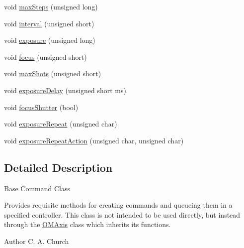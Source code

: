 \begin{DoxyCompactItemize}
\item 
void \hyperlink{class_o_m_command_acd5345ece18b375ba992af3b4317cb8d}{maxSteps} (unsigned long)
\item 
void \hyperlink{class_o_m_command_ac9b02c84746c59673538125ef61ae132}{interval} (unsigned short)
\item 
void \hyperlink{class_o_m_command_aab1d9a9eb29435af73c24f5799f4f8fe}{exposure} (unsigned long)
\item 
void \hyperlink{class_o_m_command_ae5a8b76a5666b1ff65216b48595932ec}{focus} (unsigned short)
\item 
void \hyperlink{class_o_m_command_aa826663213a989c75691a4c88cac4707}{maxShots} (unsigned short)
\item 
void \hyperlink{class_o_m_command_aba1bbf0fffb35a7806ed588b359e354e}{exposureDelay} (unsigned short ms)
\item 
void \hyperlink{class_o_m_command_ac674fe6db903fc35848bc10645ca36a3}{focusShutter} (bool)
\item 
void \hyperlink{class_o_m_command_ae11a454df4e3a0c756a9f9fbcd09af93}{exposureRepeat} (unsigned char)
\item 
void \hyperlink{class_o_m_command_acd64a99f15232a5946293f4f0e51a5be}{exposureRepeatAction} (unsigned char, unsigned char)
\end{DoxyCompactItemize}


\subsection{Detailed Description}
Base Command Class

Provides requisite methods for creating commands and queueing them in a specified controller. This class is not intended to be used directly, but instead through the \hyperlink{class_o_m_axis}{OMAxis} class which inherits its functions.

\begin{DoxyAuthor}{Author}
C. A. Church 
\end{DoxyAuthor}



